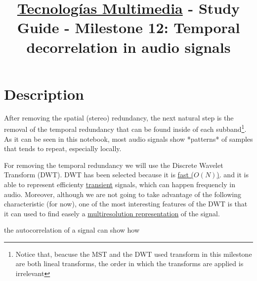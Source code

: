 \title{\href{https://www.ual.es/estudios/grados/presentacion/plandeestudios/asignatura/4015/40154321?idioma=zh_CN}{Tecnologías Multimedia} - Study Guide - Milestone 12: Temporal decorrelation in audio signals}

\maketitle

\section{Description}

After removing the spatial (stereo) redundancy, the next natural step
is the removal of the temporal redundancy that can be found inside of
each subband\footnote{Notice that, beacuse the MST and the DWT used
transform in this milestone are both lineal transforms, the order in
which the transforms are applied is irrelevant}. As it can be seen in
this notebook, most audio signals show *patterns* of samples that
tends to repeat, especially locally.

For removing the temporal redundancy we will use the Discrete Wavelet
Transform (DWT). DWT has been selected because it is
\href{https://en.wikipedia.org/wiki/Discrete_wavelet_transform#Time_complexity}{fast
  ($O(N)$)}. and it is able to represent efficienty
\href{https://en.wikipedia.org/wiki/Transient_(oscillation)}{transient}
signals, which can happen frequencly in audio. Moreover, although we
are not going to take advantage of the following characteristic (for
now), one of the most interesting features of the DWT is that it can
used to find easely a
\href{https://en.wikipedia.org/wiki/Multiresolution_analysis}{multiresolution
  representation} of the signal.

the autocorrelation of a signal can show how 


